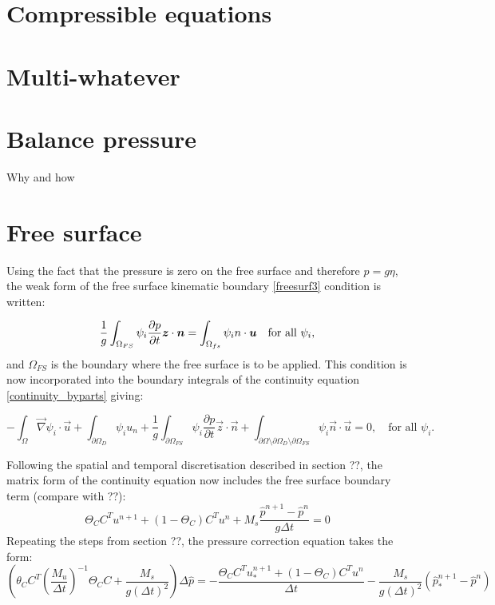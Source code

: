 \section{Compressible equations}

\section{Multi-whatever}

\section{Balance pressure}
\label{Sect:balance_pressure}
Why and how

\section{Free surface}

Using the fact that the pressure is zero on the free surface and therefore $p=g\eta$, the weak form of the free surface kinematic boundary \eqref{freesurf3} condition is written:

\begin{equation}\label{weakfreesurf3}
\frac{1}{g} \int_{\Omega_{FS}} {\psi_i }\frac{\partial p}{\partial t}{\mbox{\boldmath$z$}} \cdot {\mbox{\boldmath$n$}}=\int_{\Omega_{fs}} \psi_i {n \cdot {\mbox{\boldmath${\mbox{\boldmath$u$}}$}}} \quad
  \text{for all } \psi_i,
\end{equation}
and $\Omega_{FS}$ is the boundary where the free surface is to be applied. This condition is now incorporated into the boundary integrals of the continuity equation \eqref{continuity_byparts} giving:

\begin{equation}\label{continuity_byparts_withfs}
  -\int_\Omega \vec\nabla\psi_i \cdot \vec u
  + \int_{\partial\Omega_D} \psi_i u_n
  + \frac{1}{g} \int_{\partial\Omega_{FS}}  {\psi_i }\frac{\partial p}{\partial t}\vec z \cdot \vec n
  + \int_{\partial\Omega\setminus\partial\Omega_D\setminus\partial\Omega_{FS}} \psi_i\vec n\cdot \vec u
  = 0,\quad
  \text{for all } \psi_i.
\end{equation}

Following the spatial and temporal discretisation described in section ??, the matrix form of the continuity equation now includes the free surface boundary term (compare with ??):
\begin{equation}
\Theta_C C^T u^{n+1} + (1-\Theta_C) C^T u^n + M_s \frac{\hat p^{n+1}-\hat p^n}{g \Delta t}=0
\end{equation}
Repeating the steps from section ??, the pressure correction equation takes the form:
\begin{equation}
(\theta_C C^T(\frac{M_u}{\Delta t})^{-1} \Theta_C C + \frac{M_s}{g(\Delta t)^2})\Delta \hat p = -\frac{\Theta_C C^T u_*^{n+1} + (1-\Theta_C)C^Tu^n}{\Delta t}-\frac{M_s}{g(\Delta t)^2}(\hat p_*^{n+1}-\hat p^n)
\end{equation}


